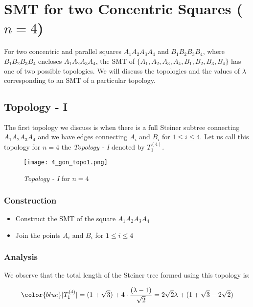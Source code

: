 



\section{SMT for two Concentric Squares ($n = 4$)} \label{sqaures}


For two concentric and parallel squares $A_1A_2A_3A_4$ and $B_1B_2B_3B_4$, where $B_1B_2B_3B_4$ encloses $A_1A_2A_3A_4$, the SMT of $\{A_1, A_2, A_3, A_4, B_1, B_2, B_3, B_4\}$ has one of two possible topologies. We will discuss the topologies and the values of $\lambda$ corresponding to an SMT of a particular topology.
\vspace{0.2cm}
\subsection{Topology - I}
\vspace{0.2cm}

The first topology we discuss is when there is a full Steiner subtree connecting $A_1A_2A_3A_4$ and we have edges connecting $A_i$ and $B_i$ for $1 \le i \le 4$. Let us call this topology for $n = 4$ the \emph{Topology - I} denoted by $T^{(4)}_1$.


\begin{figure}[h!]
\centering
\texttt{[image: 4\_gon\_topo1.png]}
\caption{ \emph{Topology - I} for $n = 4$ }
\end{figure}

\subsubsection{Construction}

\begin{itemize}
    \item Construct the SMT of the square $A_1A_2A_3A_4$
    \item Join the points $A_i$ and $B_i$ for $1 \le i \le 4$
\end{itemize}

\subsubsection{Analysis}

We observe that the total length of the Steiner tree formed using this topology is:

$$\color{blue}
|T^{(4)}_1| = (1 + \sqrt{3}) + 4 \cdot \frac{(\lambda - 1)}{\sqrt{2}} = 2 \sqrt{2} \lambda + (1 + \sqrt{3} - 2 \sqrt{2})
$$

